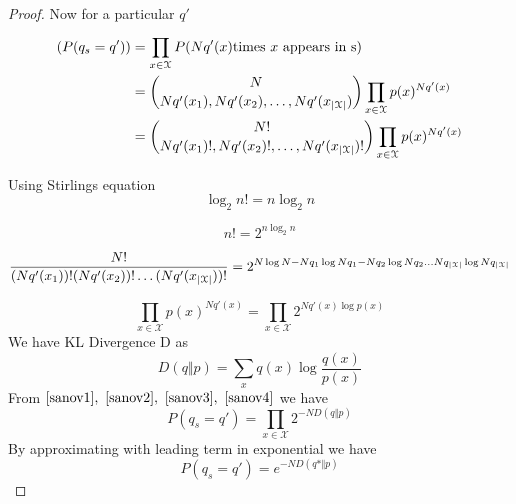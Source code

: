 \documentclass[letterpaper,english,12pt]{article}
\begin{document}
\begin{proof} 
  Now for a particular $q'$ 
  \begin{equation} \label{sanov1}
  \begin{split}
      (P(q_{s}=q')) & =  \prod_{x\in \mathcal{X}}^{} P(Nq'(x) \text{times $x$ appears in s)}\\
      & ={N \choose Nq'(x_1), Nq'(x_2), \dots, Nq'(x_{\left\lvert\mathcal{X}\right\rvert})} \prod_{x \in \mathcal{X}} p(x)^{Nq'(x)}\\
      & ={N! \choose{Nq'(x_1)}!,Nq'(x_2)!,\dots,Nq'(x_{\left\lvert\mathcal{X}\right\rvert})!} \prod_{x \in \mathcal{X}} p(x)^{Nq'(x)}\\
  \end{split}
  \end{equation}
  
  Using Stirlings equation 
  \begin{equation}
  \log_2 n! = n \log_2 n
  \end{equation}
  
  \begin{equation}
    n! = 2^{n\log_2 n} \label{sanov2}
  \end{equation}
  
  
  \begin{equation} \label{sanov3}
  \dfrac{N!}{(Nq'(x_1))! (Nq'(x_2))! \dots (Nq'(x_{\left\lvert\mathcal{X}\right\rvert}))!} 
  =  2^{N\log N - Nq_1\log{Nq_1} - Nq_2\log{Nq_2} \dots Nq_{\left\lvert\mathcal{X}\right\rvert} \log{Nq_{\left\lvert\mathcal{X}\right\rvert}}}
  \end{equation}
  
  \begin{equation} \label{sanov4}
      \prod_{x \in \mathcal{X}} p(x)^{Nq'(x)}= \prod_{x \in \mathcal{X}} 2^{Nq'(x)\log p(x)}
  \end{equation}
  We have KL Divergence D as 
  \begin{equation}
      D(q \Vert p) = \sum_{x}{}q(x)\log \dfrac{q(x)}{p(x)}
  \end{equation}
  From $\ref{sanov1},~\ref{sanov2},~\ref{sanov3},~\ref{sanov4}$ we have
  \begin{equation}
      P(q_{s}=q') = \prod_{x\in \mathcal{X}}2^{-ND(q \Vert p)}
  \end{equation}
  By approximating with leading term in exponential
  we have 
  \begin{equation}
       P(q_{s}=q') = e^{-ND(q* \Vert p)}
  \end{equation}
  \end{proof}
  
\end{document}
